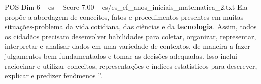 \begin{textsample}{POS Dim 6 – es – Score 7.00 – es/es\_ef\_anos\_iniciais\_matematica\_2.txt}
Ela propõe a abordagem de conceitos, fatos e procedimentos presentes em muitas situações-problema da vida cotidiana, das ciências e da \textbf{tecnologia}.
Assim, todos os cidadãos precisam desenvolver habilidades para coletar, organizar, representar, interpretar e analisar dados em uma variedade de contextos, de maneira a fazer julgamentos bem fundamentados e tomar as decisões adequadas.
Isso inclui raciocinar e utilizar conceitos, representações e índices estatísticos para descrever, explicar e predizer fenômenos ”.

\end{textsample}
